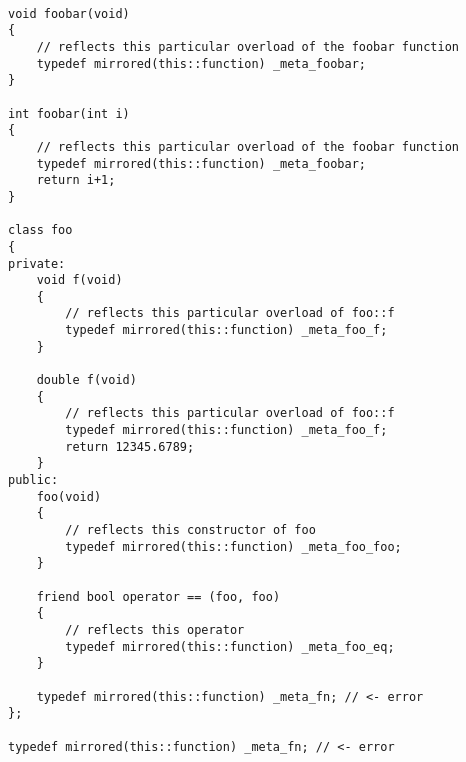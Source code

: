 \begin{verbatim}

void foobar(void)
{
	// reflects this particular overload of the foobar function
	typedef mirrored(this::function) _meta_foobar;
}

int foobar(int i)
{
	// reflects this particular overload of the foobar function
	typedef mirrored(this::function) _meta_foobar;
	return i+1;
}

class foo
{
private:
	void f(void)
	{
		// reflects this particular overload of foo::f
		typedef mirrored(this::function) _meta_foo_f;
	}

	double f(void)
	{
		// reflects this particular overload of foo::f
		typedef mirrored(this::function) _meta_foo_f;
		return 12345.6789;
	}
public:
	foo(void)
	{
		// reflects this constructor of foo
		typedef mirrored(this::function) _meta_foo_foo;
	}

	friend bool operator == (foo, foo)
	{
		// reflects this operator
		typedef mirrored(this::function) _meta_foo_eq;
	}

	typedef mirrored(this::function) _meta_fn; // <- error
};

typedef mirrored(this::function) _meta_fn; // <- error

\end{verbatim}

